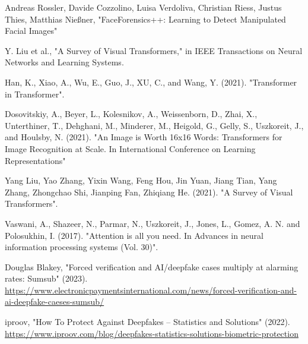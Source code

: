 \begin{thebibliography}{99}

     Andreas Rossler, Davide Cozzolino, Luisa Verdoliva, Christian Riess, Justus Thies, Matthias Nießner, "FaceForensics++: Learning to Detect Manipulated Facial Images"










     Y. Liu et al., "A Survey of Visual Transformers," in IEEE Transactions on Neural Networks and Learning Systems.

     Han, K., Xiao, A., Wu, E., Guo, J., XU, C., and Wang, Y. (2021). "Transformer in Transformer". 

     Dosovitskiy, A., Beyer, L., Kolesnikov, A., Weissenborn, D., Zhai, X., Unterthiner, T., Dehghani, M., Minderer, M., Heigold, G., Gelly, S., Uszkoreit, J., and Houlsby, N. (2021). "An Image is Worth 16x16 Words: Transformers for Image Recognition at Scale. In International Conference on Learning Representations"

     Yang Liu, Yao Zhang, Yixin Wang, Feng Hou, Jin Yuan,
    Jiang Tian, Yang Zhang, Zhongchao Shi, Jianping Fan, Zhiqiang He. (2021). "A Survey of Visual Transformers".

     Vaswani, A., Shazeer, N., Parmar, N., Uszkoreit, J., Jones, L., Gomez, A. N. and Polosukhin, I. (2017). "Attention is all you need. In Advances in neural information processing systems (Vol. 30)".

     Douglas Blakey, "Forced verification and AI/deepfake cases multiply at alarming rates: Sumsub" (2023). \url{https://www.electronicpaymentsinternational.com/news/forced-verification-and-ai-deepfake-caeses-sumsub/}

     iproov, "How To Protect Against Deepfakes – Statistics and Solutions" (2022). \url{https://www.iproov.com/blog/deepfakes-statistics-solutions-biometric-protection} 
\end{thebibliography}

